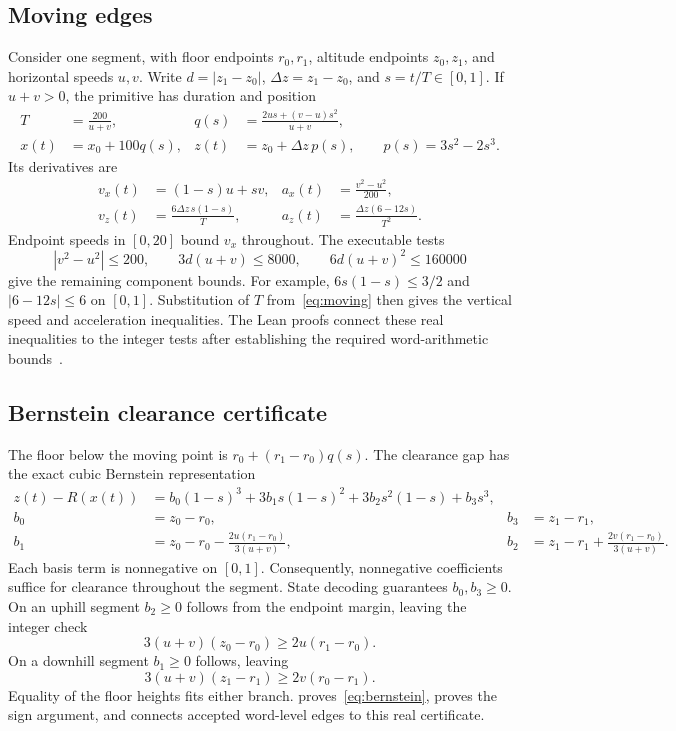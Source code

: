 \documentclass[11pt]{article}
\begin{document}
\subsection{Moving edges}

Consider one segment, with floor endpoints $r_0,r_1$, altitude endpoints $z_0,z_1$, and horizontal speeds $u,v$.  Write $d=|z_1-z_0|$, $\Delta z=z_1-z_0$, and $s=t/T\in[0,1]$.  If $u+v>0$, the primitive has duration and position
\begin{align}
 T&=\frac{200}{u+v},&
 q(s)&=\frac{2us+(v-u)s^2}{u+v},\label{eq:moving}\\
 x(t)&=x_0+100q(s),&
 z(t)&=z_0+\Delta z\,p(s),\qquad p(s)=3s^2-2s^3.
\end{align}
Its derivatives are
\begin{align}
 v_x(t)&=(1-s)u+sv,& a_x(t)&=\frac{v^2-u^2}{200},\\
 v_z(t)&=\frac{6\Delta z\,s(1-s)}{T},&
 a_z(t)&=\frac{\Delta z(6-12s)}{T^2}.
\end{align}
Endpoint speeds in $[0,20]$ bound $v_x$ throughout.  The executable tests
\begin{equation}
 |v^2-u^2|\leq200,\qquad
 3d(u+v)\leq8000,\qquad
 6d(u+v)^2\leq160000
 \label{eq:guards}
\end{equation}
give the remaining component bounds.  For example, $6s(1-s)\leq3/2$ and $|6-12s|\leq6$ on $[0,1]$.  Substitution of $T$ from~\eqref{eq:moving} then gives the vertical speed and acceleration inequalities.  The Lean proofs connect these real inequalities to the integer tests after establishing the required word-arithmetic bounds~\cite{drone-proofs}.

\subsection{Bernstein clearance certificate}

The floor below the moving point is $r_0+(r_1-r_0)q(s)$.  The clearance gap has the exact cubic Bernstein representation
\begin{align}
 z(t)-R(x(t))
 &=b_0(1-s)^3+3b_1s(1-s)^2+3b_2s^2(1-s)+b_3s^3,\label{eq:bernstein}\\
 b_0&=z_0-r_0,& b_3&=z_1-r_1,\nonumber\\
 b_1&=z_0-r_0-\frac{2u(r_1-r_0)}{3(u+v)},&
 b_2&=z_1-r_1+\frac{2v(r_1-r_0)}{3(u+v)}.\nonumber
\end{align}
Each basis term is nonnegative on $[0,1]$.  Consequently, nonnegative coefficients suffice for clearance throughout the segment.  State decoding guarantees $b_0,b_3\geq0$.  On an uphill segment $b_2\geq0$ follows from the endpoint margin, leaving the integer check
\[
 3(u+v)(z_0-r_0)\geq2u(r_1-r_0).
\]
On a downhill segment $b_1\geq0$ follows, leaving
\[
 3(u+v)(z_1-r_1)\geq2v(r_0-r_1).
\]
Equality of the floor heights fits either branch.   proves~\eqref{eq:bernstein},  proves the sign argument, and  connects accepted word-level edges to this real certificate.
\end{document}
